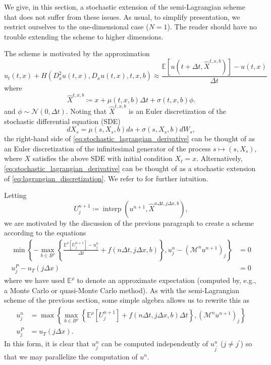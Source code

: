 \documentclass[12pt]{article}
\begin{document}
We give, in this section, a stochastic extension of the semi-Lagrangian
scheme that does not suffer from these issues. As usual, to simplify
presentation, we restrict ourselves to the one-dimensional case ($N=1$).
The reader should have no trouble extending the scheme to higher dimensions.

The scheme is motivated by the approximation
\begin{equation}
u_{t}(t,x)+H(D_{x}^{2}u(t,x),D_{x}u(t,x),t,x,b)\approx\frac{\mathbb{E}\left[u(t+\Delta t,\hat{X}^{t,x,b})\right]-u(t,x)}{\Delta t}\label{eq:stochastic_lagrangian_derivative}
\end{equation}
where
\[
\hat{X}^{t,x,b}\coloneqq x+\mu(t,x,b)\Delta t+\sigma(t,x,b)\phi.
\]
and $\phi\sim\mathcal{N}(0,\Delta t)$. Noting that $\hat{X}^{t,x,b}$
is an Euler discretization of the stochastic differential equation
(SDE) 
\[
dX_{s}=\mu(s,X_{s},b)ds+\sigma(s,X_{s},b)dW_{s},
\]
the right-hand side of \eqref{eq:stochastic_lagrangian_derivative}
can be thought of as an Euler discretization of the infinitesimal
generator of the process $s\mapsto(s,X_{s})$, where $X$ satisfies
the above SDE with initial condition $X_{t}=x$. Alternatively, \eqref{eq:stochastic_lagrangian_derivative}
can be thought of as a stochastic extension of \eqref{eq:lagrangian_discretization}.
We refer to \cite{MR2857450,MR3190342} for further intuition.

Letting
\begin{equation}
U_j^{n+1}\coloneqq {\operatorname{interp}}(u^{n+1},\hat{X}^{n\Delta t,j\Delta x,b}),\label{eq:rv}
\end{equation}
we are motivated by the discussion of the previous paragraph to create
a scheme according to the equations
\begin{align}
\min\left\{ -\max_{b\in B^{\rho}}\left\{ \frac{\mathbb{E}^{\rho}\left[U_j^{n+1}\right]-u_{j}^{n}}{\Delta t}+f(n\Delta t,j\Delta x,b)\right\} ,u_{j}^{n}-(\mathcal{M}^{n}u^{n+1})_{j}\right\}  & =0\nonumber \\
u_{j}^{P}-u_{T}(j\Delta x) & =0\label{eq:stochastic_semi_lagrangian_scheme}
\end{align}
where we have used $\mathbb{E}^{\rho}$ to denote an approximate expectation
(computed by, e.g., a Monte Carlo or quasi-Monte Carlo method). As
with the semi-Lagrangian scheme of the previous section, some simple
algebra allows us to rewrite this as
\begin{align}
u_{j}^{n} & =\max\left\{ \max_{b\in B^{\rho}}\left\{ \mathbb{E}^{\rho}\left[U_j^{n+1}\right]+f(n\Delta t,j\Delta x,b)\Delta t\right\} ,(\mathcal{M}^{n}u^{n+1})_{j}\right\} \nonumber \\
u_{j}^{P} & =u_{T}(j\Delta x).\label{eq:stochastic_semi_lagrangian_scheme_modified}
\end{align}
In this form, it is clear that $u_{j}^{n}$ can be computed independently
of $u_{j^{\prime}}^{n}$ ($j\neq j^{\prime}$) so that we may parallelize
the computation of $u^{n}$.
\end{document}

